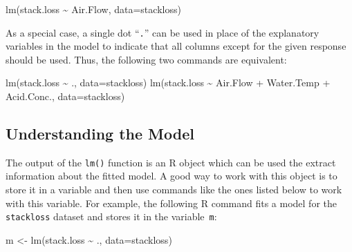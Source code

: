 \documentclass[
  a4paper,
]{article}
\newenvironment{Shaded}{\begin{snugshade}}{\end{snugshade}}
\newcommand{\AttributeTok}[1]{\textcolor[rgb]{0.77,0.63,0.00}{#1}}
\newcommand{\FunctionTok}[1]{\textcolor[rgb]{0.00,0.00,0.00}{#1}}
\newcommand{\NormalTok}[1]{#1}
\newcommand{\OtherTok}[1]{\textcolor[rgb]{0.56,0.35,0.01}{#1}}
\newcommand{\SpecialCharTok}[1]{\textcolor[rgb]{0.00,0.00,0.00}{#1}}
\theoremstyle{definition}
\theoremstyle{definition}
\theoremstyle{definition}
\theoremstyle{definition}
\theoremstyle{remark}
\begin{document}
\begin{itemize}
\begin{Shaded}
\begin{Highlighting}[]
  \FunctionTok{lm}\NormalTok{(stack.loss }\SpecialCharTok{\textasciitilde{}}\NormalTok{ Air.Flow, }\AttributeTok{data=}\NormalTok{stackloss)}
\end{Highlighting}
\end{Shaded}

  As a special case, a single dot ``\texttt{.}'' can be used in place of
  the explanatory variables in the model to indicate that all columns
  except for the given response should be used. Thus, the following
  two commands are equivalent:

\begin{Shaded}
\begin{Highlighting}[]
  \FunctionTok{lm}\NormalTok{(stack.loss }\SpecialCharTok{\textasciitilde{}}\NormalTok{ ., }\AttributeTok{data=}\NormalTok{stackloss)}
  \FunctionTok{lm}\NormalTok{(stack.loss }\SpecialCharTok{\textasciitilde{}}\NormalTok{ Air.Flow }\SpecialCharTok{+}\NormalTok{ Water.Temp }\SpecialCharTok{+}\NormalTok{ Acid.Conc., }\AttributeTok{data=}\NormalTok{stackloss)}
\end{Highlighting}
\end{Shaded}
\end{itemize}

\hypertarget{lm-model}{%
\subsection*{Understanding the Model}\label{lm-model}}

The output of the \texttt{lm()} function is an R object which can be used the extract
information about the fitted model. A good way to work with this object is to
store it in a variable and then use commands like the ones listed below to work
with this variable. For example, the following R command fits a model for the
\texttt{stackloss} dataset and stores it in the variable~\texttt{m}:

\begin{Shaded}
\begin{Highlighting}[]
\NormalTok{  m }\OtherTok{\textless{}{-}} \FunctionTok{lm}\NormalTok{(stack.loss }\SpecialCharTok{\textasciitilde{}}\NormalTok{ ., }\AttributeTok{data=}\NormalTok{stackloss)}
\end{Highlighting}
\end{Shaded}
\end{document}

